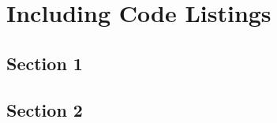 \chapter{Including Code Listings}\label{app:codelistings}
  \section{Section 1}\label{sec:A3section1}
    
  \section{Section 2}\label{sec:A3section2}
    
